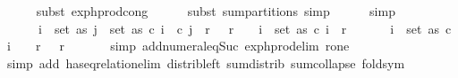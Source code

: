 \begin{isabellebody}
\ \ \ \ \isamarkupfalse%
\ {\isacharparenleft}{\kern0pt}subst\ exp{\isacharunderscore}{\kern0pt}h{\isacharunderscore}{\kern0pt}prod{\isacharunderscore}{\kern0pt}cong{\isacharparenright}{\kern0pt}\isanewline
\ \ \ \ \isamarkupfalse%
\ {\isacharparenleft}{\kern0pt}subst\ sum{\isacharunderscore}{\kern0pt}partitions{\isacharprime}{\kern0pt}{\isacharcomma}{\kern0pt}\ simp{\isacharparenright}{\kern0pt}\isanewline
\ \ \ \ \isamarkupfalse%
\ simp\isanewline
\ \ \isamarkupfalse%
\ \isamarkupfalse%
\ {\isachardoublequoteopen}{\isachardot}{\kern0pt}{\isachardot}{\kern0pt}{\isachardot}{\kern0pt}\ {\isacharequal}{\kern0pt}\ \isanewline
\ \ \ \ {}\ {\isacharasterisk}{\kern0pt}\ {\isacharparenleft}{\kern0pt}{\isasymSum}i\ {\isasymin}\ set\ as{\isachardot}{\kern0pt}\ {\isacharparenleft}{\kern0pt}{\isasymSum}j\ {\isasymin}\ set\ as{\isachardot}{\kern0pt}\ c\ i{\isacharcircum}{\kern0pt}{}\ {\isacharasterisk}{\kern0pt}\ c\ j{\isacharcircum}{\kern0pt}{}\ {\isacharasterisk}{\kern0pt}\ r\ {}\ {\isacharasterisk}{\kern0pt}\ r\ {}{\isacharparenright}{\kern0pt}{\isacharparenright}{\kern0pt}\ {\isacharplus}{\kern0pt}\ {\isacharparenleft}{\kern0pt}{\isacharparenleft}{\kern0pt}{\isasymSum}\ i\ {\isasymin}\ set\ as{\isachardot}{\kern0pt}\ c\ i{\isacharcircum}{\kern0pt}{}\ {\isacharasterisk}{\kern0pt}\ r\ {}{\isacharparenright}{\kern0pt}\ {\isacharminus}{\kern0pt}\ {}\ {\isacharasterisk}{\kern0pt}\ \ {\isacharparenleft}{\kern0pt}{\isasymSum}\ i\ {\isasymin}\ set\ as{\isachardot}{\kern0pt}\ c\ i\ {\isacharcircum}{\kern0pt}\ {}\ {\isacharasterisk}{\kern0pt}\ r\ {}\ {\isacharasterisk}{\kern0pt}\ r\ {}{\isacharparenright}{\kern0pt}{\isacharparenright}{\kern0pt}{\isachardoublequoteclose}\isanewline
\ \ \ \ \isamarkupfalse%
\ {\isacharparenleft}{\kern0pt}simp\ add{\isacharcolon}{\kern0pt}numeral{\isacharunderscore}{\kern0pt}eq{\isacharunderscore}{\kern0pt}Suc\ exp{\isacharunderscore}{\kern0pt}h{\isacharunderscore}{\kern0pt}prod{\isacharunderscore}{\kern0pt}elim\ r{\isacharunderscore}{\kern0pt}one{\isacharparenright}{\kern0pt}\ \isanewline
\ \ \ \ \isamarkupfalse%
\ {\isacharparenleft}{\kern0pt}simp\ add{\isacharcolon}{\kern0pt}\ has{\isacharunderscore}{\kern0pt}eq{\isacharunderscore}{\kern0pt}relation{\isacharunderscore}{\kern0pt}elim\ distrib{\isacharunderscore}{\kern0pt}left\ sum{\isachardot}{\kern0pt}distrib\ sum{\isacharunderscore}{\kern0pt}collapse\ fold{\isacharunderscore}{\kern0pt}sym{\isacharparenright}{\kern0pt}\isanewline

\end{isabellebody}

